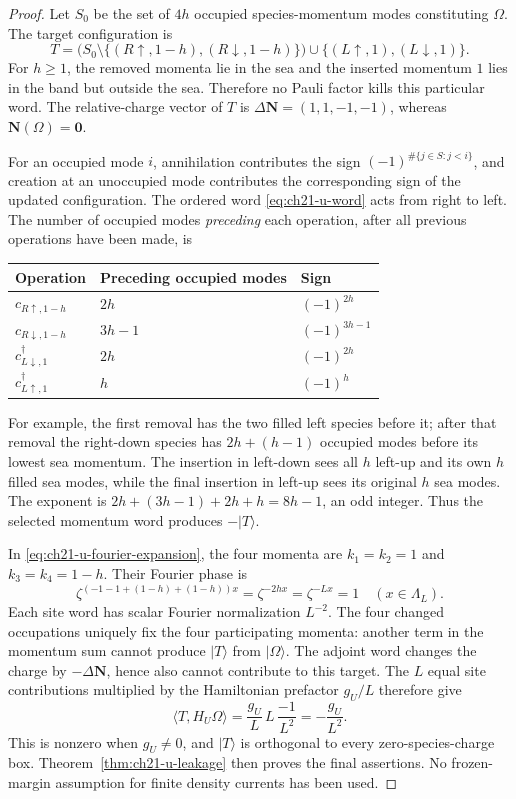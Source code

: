 \begin{proof}
Let \(S_0\) be the set of \(4h\) occupied species-momentum modes
constituting \(\Omega\).  The target configuration is
\[
 T=\bigl(S_0\setminus\{(R\uparrow,1-h),(R\downarrow,1-h)\}\bigr)
     \cup\{(L\uparrow,1),(L\downarrow,1)\}.
\]
For \(h\ge1\), the removed momenta lie in the sea and the inserted
momentum \(1\) lies in the band but outside the sea.  Therefore no
Pauli factor kills this particular word.  The relative-charge vector
of \(T\) is \(\Delta\mathbf N=(1,1,-1,-1)\), whereas
\(\mathbf N(\Omega)=\mathbf0\).

For an occupied mode \(i\), annihilation contributes the sign
\((-1)^{\#\{j\in S:j<i\}}\), and creation at an unoccupied mode
contributes the corresponding sign of the updated configuration.
The ordered word \eqref{eq:ch21-u-word} acts from right to left.
The number of occupied modes \emph{preceding} each operation, after
all previous operations have been made, is
\begin{center}
\begin{tabular}{@{}lll@{}}
\toprule
Operation & Preceding occupied modes & Sign \\
\midrule
\(c_{R\uparrow,1-h}\) & \(2h\) & \((-1)^{2h}\) \\
\(c_{R\downarrow,1-h}\) & \(3h-1\) & \((-1)^{3h-1}\) \\
\(c_{L\downarrow,1}^\dagger\) & \(2h\) & \((-1)^{2h}\) \\
\(c_{L\uparrow,1}^\dagger\) & \(h\) & \((-1)^h\) \\
\bottomrule
\end{tabular}
\end{center}
For example, the first removal has the two filled left species before
it; after that removal the right-down species has \(2h+(h-1)\)
occupied modes before its lowest sea momentum.  The insertion in
left-down sees all \(h\) left-up and its own \(h\) filled sea modes,
while the final insertion in left-up sees its original \(h\) sea modes.
The exponent is \(2h+(3h-1)+2h+h=8h-1\), an odd integer.
Thus the selected momentum word produces \(-|T\rangle\).

In \eqref{eq:ch21-u-fourier-expansion}, the four momenta are
\(k_1=k_2=1\) and \(k_3=k_4=1-h\).  Their Fourier phase is
\[
 \zeta^{(-1-1+(1-h)+(1-h))x}
    =\zeta^{-2hx}=\zeta^{-Lx}=1
       \quad(x\in\Lambda_L).
\]
Each site word has scalar Fourier normalization \(L^{-2}\).
The four changed occupations uniquely fix the four participating
momenta: another term in the momentum sum cannot produce \(|T\rangle\)
from \(|\Omega\rangle\).  The adjoint word changes the charge by
\(-\Delta\mathbf N\), hence also cannot contribute to this target.
The \(L\) equal site contributions multiplied by the Hamiltonian
prefactor \(g_U/L\) therefore give
\[
 \langle T,H_U\Omega\rangle
  =\frac{g_U}{L}\,L\,\frac{-1}{L^2}
  =-\frac{g_U}{L^2}.
\]
This is nonzero when \(g_U\ne0\), and \(|T\rangle\) is orthogonal
to every zero-species-charge box.  Theorem~\ref{thm:ch21-u-leakage}
then proves the final assertions.  No frozen-margin assumption for
finite density currents has been used.
\end{proof}

